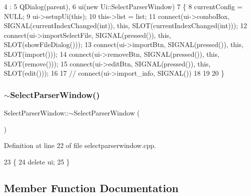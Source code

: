 \begin{DoxyCode}
4                                                                                    :
5     QDialog(parent),
6     ui(\textcolor{keyword}{new} Ui::SelectParserWindow)
7 \{
8     currentConfig = NULL;
9     ui->setupUi(\textcolor{keyword}{this});
10     this->list = list;
11     connect(ui->comboBox, SIGNAL(currentIndexChanged(\textcolor{keywordtype}{int})), \textcolor{keyword}{this}, SLOT(currentIndexChanged(\textcolor{keywordtype}{int})));
12     connect(ui->importSelectFile, SIGNAL(pressed()), \textcolor{keyword}{this}, SLOT(showFileDialog()));
13     connect(ui->importBtn, SIGNAL(pressed()), \textcolor{keyword}{this}, SLOT(\textcolor{keyword}{import}()));
14     connect(ui->removeBtn, SIGNAL(pressed()), \textcolor{keyword}{this}, SLOT(\textcolor{keyword}{remove}()));
15     connect(ui->editBtn, SIGNAL(pressed()), \textcolor{keyword}{this}, SLOT(edit()));
16 
17 \textcolor{comment}{//    connect(ui->import\_info, SIGNAL())}
18 
19 
20 \}
\end{DoxyCode}
\mbox{\label{class_select_parser_window_ab4e0f7c430edbbfd05ed21e8f9737db9}} 
\subsubsection{\texorpdfstring{$\sim$\+Select\+Parser\+Window()}{~SelectParserWindow()}}
{\footnotesize\ttfamily Select\+Parser\+Window\+::$\sim$\+Select\+Parser\+Window (\begin{DoxyParamCaption}{ }\end{DoxyParamCaption})}



Definition at line 22 of file selectparserwindow.\+cpp.


\begin{DoxyCode}
23 \{
24     \textcolor{keyword}{delete} ui;
25 \}
\end{DoxyCode}


\subsection{Member Function Documentation}
\mbox{\label{class_select_parser_window_ab6397caf6e7270309a5b57befb3f144f}} 
